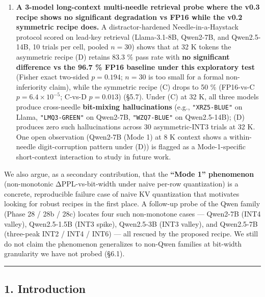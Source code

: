 \begin{enumerate}
  conservative independent-proportion delta standard error at this
  sample size (§5.6). This is a single-task probe and does not replace a
  full downstream campaign; we discuss scope in §5.6.
\item
  \textbf{A 3-model long-context multi-needle retrieval probe where the
  v0.3 recipe shows no significant degradation vs FP16 while the v0.2
  symmetric recipe does.} A distractor-hardened Needle-in-a-Haystack
  protocol scored on lead-key retrieval (Llama-3.1-8B, Qwen2-7B, and
  Qwen2.5-14B, 10 trials per cell, pooled \(n = 30\)) shows that at 32 K
  tokens the asymmetric recipe (D) retains 83.3 \% pass rate with
  \textbf{no significant difference vs the 96.7 \% FP16 baseline under
  this exploratory test} (Fisher exact two-sided \(p = 0.194\);
  \(n = 30\) is too small for a formal non-inferiority claim), while the
  symmetric recipe (C) drops to 50 \% (FP16-vs-C
  \(p = 6.4 \times 10^{-5}\); C-vs-D \(p = 0.013\)) (§5.7). Under (C) at
  32 K, all three models produce cross-needle \textbf{bit-mixing
  hallucinations} (e.g., \texttt{"XRZ5-BLUE"} on Llama,
  \texttt{"LMQ3-GREEN"} on Qwen2-7B, \texttt{"WZQ7-BLUE"} on
  Qwen2.5-14B); (D) produces zero such hallucinations across 30
  asymmetric-INT3 trials at 32 K. One open observation (Qwen2-7B (Mode
  1) at 8 K context shows a within-needle digit-corruption pattern under
  (D)) is flagged as a Mode-1-specific short-context interaction to
  study in future work.
\end{enumerate}

We also argue, as a secondary contribution, that the \textbf{``Mode 1''
phenomenon} (non-monotonic ΔPPL-vs-bit-width under naive per-row
quantization) is a concrete, reproducible failure case of naive KV
quantization that motivates looking for robust recipes in the first
place. A follow-up probe of the Qwen family (Phase 28 / 28b / 28c)
locates four such non-monotone cases --- Qwen2-7B (INT4 valley),
Qwen2.5-1.5B (INT3 spike), Qwen2.5-3B (INT3 valley), and Qwen2.5-7B
(three-peak INT2 / INT4 / INT6) --- all rescued by the proposed recipe.
We still do not claim the phenomenon generalizes to non-Qwen families at
bit-width granularity we have not probed (§6.1).

\begin{center}\rule{0.5\linewidth}{0.5pt}\end{center}

\subsection{1. Introduction}\label{introduction}

